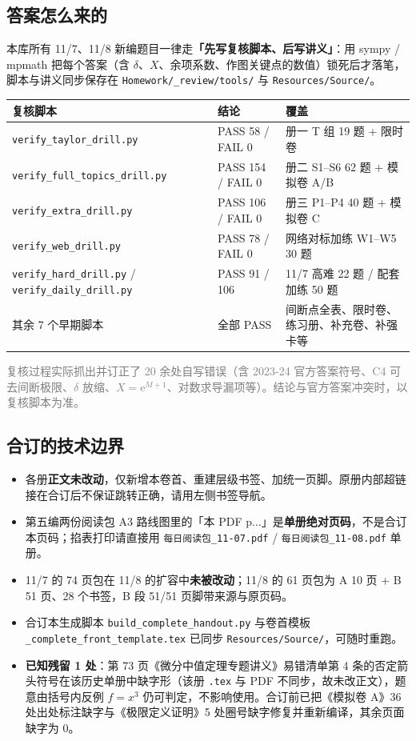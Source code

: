 \documentclass[11pt,a4paper]{ctexart}
\newcommand{\ee}{\mathrm{e}}
\begin{document}
\subsection{答案怎么来的}
本库所有 11/7、11/8 新编题目一律走\textbf{「先写复核脚本、后写讲义」}：用 sympy / mpmath 把每个答案（含 $\delta$、$X$、余项系数、作图关键点的数值）锁死后才落笔，脚本与讲义同步保存在 \texttt{Homework/\_review/tools/} 与 \texttt{Resources/Source/}。

\begin{longtable}{@{}p{6.6cm}p{2.3cm}p{6.1cm}@{}}
\toprule
\textbf{复核脚本} & \textbf{结论} & \textbf{覆盖} \\
\midrule
\texttt{verify\_taylor\_drill.py} & PASS 58 / FAIL 0 & 册一 T 组 19 题 + 限时卷 \\
\texttt{verify\_full\_topics\_drill.py} & PASS 154 / FAIL 0 & 册二 S1--S6 62 题 + 模拟卷 A/B \\
\texttt{verify\_extra\_drill.py} & PASS 106 / FAIL 0 & 册三 P1--P4 40 题 + 模拟卷 C \\
\texttt{verify\_web\_drill.py} & PASS 78 / FAIL 0 & 网络对标加练 W1--W5 30 题 \\
\texttt{verify\_hard\_drill.py} / \texttt{verify\_daily\_drill.py} & PASS 91 / 106 & 11/7 高难 22 题 / 配套加练 50 题 \\
其余 7 个早期脚本 & 全部 PASS & 间断点全表、限时卷、练习册、补充卷、补强卡等 \\
\bottomrule
\end{longtable}
\noindent\textcolor{gray}{\footnotesize 复核过程实际抓出并订正了 20 余处自写错误（含 2023-24 官方答案符号、C4 可去间断极限、$\delta$ 放缩、$X=\ee^{M+1}$、对数求导漏项等）。结论与官方答案冲突时，以复核脚本为准。}

\subsection{合订的技术边界}
\begin{itemize}
\item 各册\textbf{正文未改动}，仅新增本卷首、重建层级书签、加统一页脚。原册内部超链接在合订后不保证跳转正确，请用左侧书签导航。
\item 第五编两份阅读包 A3 路线图里的「本 PDF p$\dots$」是\textbf{单册绝对页码}，不是合订本页码；掐表打印请直接用 \texttt{每日阅读包\_11-07.pdf} / \texttt{每日阅读包\_11-08.pdf} 单册。
\item 11/7 的 74 页包在 11/8 的扩容中\textbf{未被改动}；11/8 的 61 页包为 A 10 页 + B 51 页、28 个书签，B 段 51/51 页脚带来源与原页码。
\item 合订本生成脚本 \texttt{build\_complete\_handout.py} 与卷首模板 \texttt{\_complete\_front\_template.tex} 已同步 \texttt{Resources/Source/}，可随时重跑。
\item \textbf{已知残留 1 处}：第 73 页《微分中值定理专题讲义》易错清单第 4 条的否定箭头符号在该历史单册中缺字形（该册 \texttt{.tex} 与 PDF 不同步，故未改正文），题意由括号内反例 $f=x^3$ 仍可判定，不影响使用。合订前已把《模拟卷 A》36 处出处标注缺字与《极限定义证明》5 处圈号缺字修复并重新编译，其余页面缺字为 0。
\end{itemize}
\end{document}
